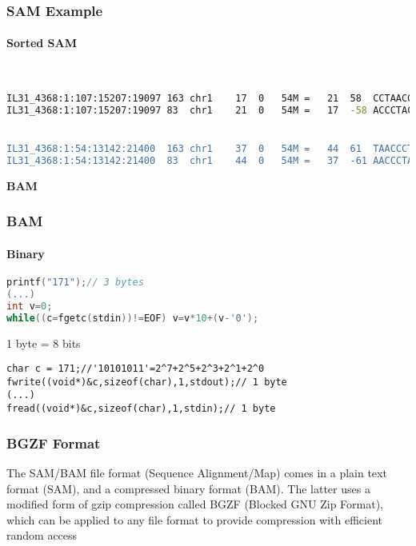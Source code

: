 \documentclass[xcolor=table]{beamer}
\newcommand{\centeredtitle}[1]{
\begin{center}
    \Huge{\bf{#1}}
\end{center}
}
\newcommand{\hugeslide}[1]{
\begin{frame}
\centeredtitle{#1}
\end{frame}
}
\begin{document}
\begin{frame}[fragile]
\frametitle{SAM Example}
\framesubtitle{Sorted SAM}
\begin{framed}\tiny
\begin{lstlisting}[language=bash,basicstyle=\tiny]


IL31_4368:1:107:15207:19097	163	chr1	17	0	54M	=	21	58	CCTAACCCTAACCCTAACCCTAACCCTAACCCTAACCCTAACCCTAACCCTAAC	EEECECA<?BE@?<B?DBBD=EBEEA=D<E=::;;@@D@;DD@A4>;8?=6>@C	XT:A:R	NM:i:0	SM:i:0	AM:i:0	X0:i:10	X1:i:0	XM:i:0	XO:i:0	XG:i:0	MD:Z:54
IL31_4368:1:107:15207:19097	83	chr1	21	0	54M	=	17	-58	ACCCTACCCCTAGCCCTAACCCTACCCCTAACCCTAACCCTAACCCTAACCCTA	-9;7170<<6;1(@><==*<?:7:*@@<<B8@@>??5CC<:<4<C@>C9B@B1B	XT:A:R	NM:i:3	SM:i:0	AM:i:0	X0:i:9	X1:i:0	XM:i:3	XO:i:0	XG:i:0	MD:Z:6A5A11A29


IL31_4368:1:54:13142:21400	163	chr1	37	0	54M	=	44	61	TAACCCTAACCCTAACCCTAACCCTAACCCTAACCCTAACCCTAACCCTAACCC	FFEEFFFFFFFEFFFCFEFCFBBDFFFBBDF@FBB@AC@@B@ABCBB>?B@@=>	XT:A:R	NM:i:0	SM:i:0	AM:i:0	X0:i:11	X1:i:0	XM:i:0	XO:i:0	XG:i:0	MD:Z:54
IL31_4368:1:54:13142:21400	83	chr1	44	0	54M	=	37	-61	AACCCTAACCCTAACCCTAACCCTAACCCTAACCCTAACCCTAACCCTAACCCT	;5@GD>@0FGBB>@EEF6EAGGDCGGEDBDGGF@?CDFAA@GGFA=<ABF><@H	XT:A:R	NM:i:0	SM:i:0	AM:i:0	X0:i:9	X1:i:2	XM:i:0	XO:i:0	XG:i:0	MD:Z:54


\end{lstlisting}
\end{framed}
\end{frame}

\hugeslide{BAM}



\begin{frame}[fragile]
\frametitle{BAM}
\framesubtitle{Binary}
\begin{lstlisting}[language=C]
printf("171");// 3 bytes
(...)
int v=0;
while((c=fgetc(stdin))!=EOF) v=v*10+(v-'0');
\end{lstlisting}

1 byte = 8 bits

\begin{lstlisting}
char c = 171;//'10101011'=2^7+2^5+2^3+2^1+2^0
fwrite((void*)&c,sizeof(char),1,stdout);// 1 byte
(...)
fread((void*)&c,sizeof(char),1,stdin);// 1 byte
\end{lstlisting}

\end{frame}



\begin{frame} 
\frametitle{BGZF Format}
The SAM/BAM file format (Sequence Alignment/Map) comes in a plain text format (SAM), and a compressed binary format (BAM). The latter uses a
modified form of gzip compression called BGZF (Blocked GNU Zip Format), which can be applied to any file format to provide compression with efficient random access
\end{frame}
\end{document}
